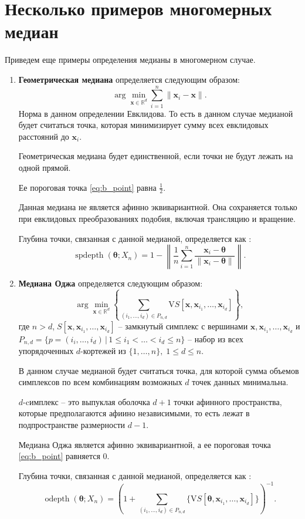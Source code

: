 \documentclass[specialist,
substylefile = spbu.rtx,
               subf,href,colorlinks=true, 12pt]{disser}
\DeclareMathOperator{\spdepth}{spdepth}
\DeclareMathOperator{\odepth}{odepth}
\begin{document}
\section{Несколько примеров многомерных медиан}
Приведем еще примеры определения медианы в многомерном случае. 
\begin{enumerate}
    \item \textbf{Геометрическая медиана} \cite{Hubert} определяется следующим образом:
  \begin{equation}
\arg\min_{\mathbf{x}\in \mathbb{R}^d} \sum\limits_{i=1}^{n}\|\mathbf{x}_i-\mathbf{x}\|.
\label{eq:spatial}
\end{equation}
    Норма в данном определении Евклидова. То есть в данном случае медианой будет считаться точка, которая минимизирует сумму всех евклидовых расстояний до $\mathbf{x}_i$.
    
    Геометрическая медиана будет единственной, если точки не будут лежать на одной прямой.
    
    Ее пороговая точка  \ref{eq:b_point} равна $\frac{1}{2}$. 
    
    Данная медиана не является афинно эквивариантной. Она сохраняется только при евклидовых преобразованиях подобия, включая трансляцию и вращение.
    
    Глубина точки, связанная с данной медианой, определяется как \cite{Robust}:
    \[\spdepth(\boldsymbol{\theta}; X_n)=1-\left\|\frac{1}{n}\sum\limits_{i=1}^{n}\frac{\mathbf{x}_i-\boldsymbol{\theta}}{\|\mathbf{x}_i-\boldsymbol{\theta}\|}\right\|.\]
    \item \textbf{Медиана Оджа} \cite{Hubert} определяется следующим образом:
      \begin{equation}
\arg\min_{\mathbf{x}\in \mathbb{R}^d}\left\{ \sum\limits_{(i_1,\ldots,i_d)\in P_{n,d}} \mathrm{V} S[\mathbf{x}, \mathbf{x}_{i_1},\ldots,\mathbf{x}_{i_d}]\right\},
\label{eq:oja}
\end{equation}
    где $n>d$,$\;S[\mathbf{x}, \mathbf{x}_{i_1},\ldots,\mathbf{x}_{i_d}]$ -- замкнутый симплекс с вершинами $\mathbf{x}, \mathbf{x}_{i_1},\ldots,\mathbf{x}_{i_d}$ и $P_{n,d}=\{p=(i_i,\ldots,i_d)\,|\,1\leqslant i_1 <\ldots<i_d\leqslant n\}$ -- набор из всех упорядоченных $d$-кортежей из $\{1,\ldots,n\},\; 1\leqslant d \leqslant n$.
   
    В данном случае медианой будет считаться точка, для которой сумма объемов симплексов по всем комбинациям возможных $d$ точек данных минимальна.
    
    $d$-cимплекс -- это выпуклая оболочка $d+1$ точки афинного пространства, которые предполагаются афиино независимыми, то есть лежат в подпространстве размерности $d-1$. 
    
    Медиана Оджа является афинно эквивариантной, а ее пороговая точка  \ref{eq:b_point} равняется 0. 
    
    Глубина точки, связанная с данной медианой, определяется как \cite{Robust}:
     \[\odepth(\boldsymbol{\theta}; X_n)=\left(1+ \sum\limits_{(i_1, \ldots ,i_d)\in P_{n,d}}\{\mathrm{V} S[\boldsymbol{\theta}, \mathbf{x}_{i_1}, \ldots ,\mathbf{x}_{i_d}]\}\right)^{-1}.\]
\end{enumerate}
\end{document}
